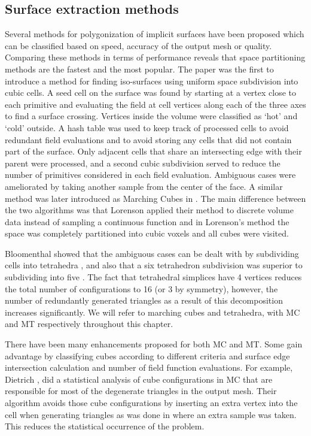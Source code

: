 \subsection{Surface extraction methods}
Several methods for polygonization of implicit surfaces have been proposed which can be 
classified based on speed, accuracy of the output mesh or quality.  Comparing these methods in terms of performance reveals that space 
partitioning methods are the fastest and the most popular. The paper \cite{Wyvill1986} was the first to introduce a method for finding 
iso-surfaces using uniform space subdivision into cubic cells. A seed cell on the surface was found by starting at a vertex close to 
each primitive and evaluating the field at cell vertices along each of the three axes to find a surface crossing. Vertices inside the 
volume were classified as `hot' and `cold' outside. A hash table was used to keep track of processed cells to avoid redundant field 
evaluations and to avoid storing any cells that did not contain part of the surface. Only adjacent cells that share an intersecting edge 
with their parent were processed, and a second cubic subdivision served to reduce the number of primitives considered in each field evaluation. 
Ambiguous cases were ameliorated by taking another sample from the center of the face.
A similar method was later introduced as Marching Cubes in \cite{Lorensen1987}. The main difference between the two algorithms was that 
Lorenson \etal applied their method to discrete volume data instead of sampling a continuous function and in Lorenson's method
the space was completely partitioned into cubic voxels and all cubes were visited.

Bloomenthal showed that the ambiguous cases can be dealt with by subdividing cells into tetrahedra \cite{Bloomenthal1994a}, and also 
that a six tetrahedron subdivision was superior to subdividing into five \cite{guziec1995exploiting}. 
The fact that tetrahedral simplices have 4 vertices reduces the total number of configurations to 16 (or 3 by symmetry), however, the number of 
redundantly generated triangles as a result of this decomposition increases significantly. 
We will refer to marching cubes and tetrahedra, with MC and MT respectively throughout this chapter.

There have been many enhancements proposed for both MC and MT. Some gain advantage by classifying cubes according to different criteria
and surface edge intersection calculation and number of field function evaluations. 
For example, Dietrich \etal \cite{Dietrich2009}, did a statistical analysis of cube configurations in MC that are responsible for most 
of the degenerate triangles in the output mesh. Their algorithm avoids those cube configurations by inserting an extra vertex into the 
cell when generating triangles as was done in \cite{Wyvill1986} where an extra sample was taken.
This reduces the statistical occurrence of the problem.


